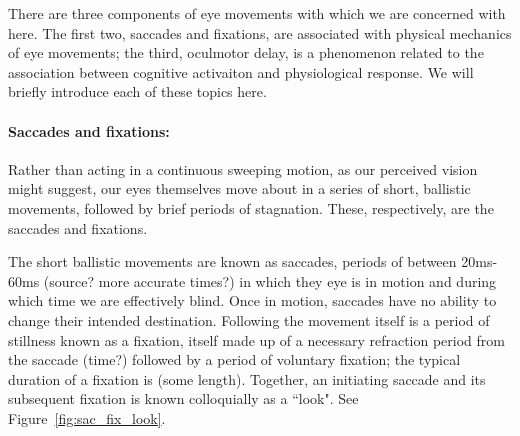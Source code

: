 \documentclass{article}
\begin{document}
There are three components of eye movements with which we are concerned with here. The first two, saccades and fixations, are associated with physical mechanics of eye movements; the third, oculmotor delay, is a phenomenon related to the association between cognitive activaiton and physiological response. We will briefly introduce each of these topics here. 

\paragraph{Saccades and fixations:} Rather than acting in a continuous sweeping motion, as our perceived vision might suggest, our eyes themselves move about in a series of short, ballistic movements, followed by brief periods of stagnation. These, respectively, are the saccades and fixations. 

The short ballistic movements are known as saccades, periods of between 20ms-60ms (source? more accurate times?) in which they eye is in motion and during which time we are effectively blind. Once in motion, saccades have no ability to change their intended destination. Following the movement itself is a period of stillness known as a fixation, itself made up of a necessary refraction period from the saccade (time?) followed by a period of voluntary fixation; the typical duration of a fixation is (some length). Together, an initiating saccade and its subsequent fixation is known colloquially as a ``look". See Figure~\ref{fig:sac_fix_look}.
\end{document}

